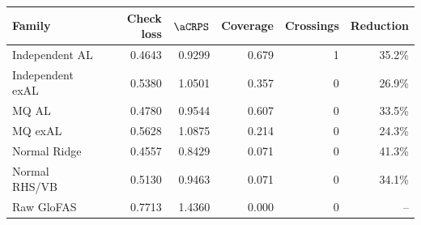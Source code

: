 \begin{tabular}{lrrrrr}
\toprule
Family & Check loss & $\aCRPS$ & Coverage & Crossings & Reduction \\
\midrule
Independent AL & 0.4643 & 0.9299 & 0.679 & 1 & 35.2\% \\
Independent exAL & 0.5380 & 1.0501 & 0.357 & 0 & 26.9\% \\
MQ AL & 0.4780 & 0.9544 & 0.607 & 0 & 33.5\% \\
MQ exAL & 0.5628 & 1.0875 & 0.214 & 0 & 24.3\% \\
Normal Ridge & 0.4557 & 0.8429 & 0.071 & 0 & 41.3\% \\
Normal RHS/VB & 0.5130 & 0.9463 & 0.071 & 0 & 34.1\% \\
Raw GloFAS & 0.7713 & 1.4360 & 0.000 & 0 & -- \\
\bottomrule
\end{tabular}
